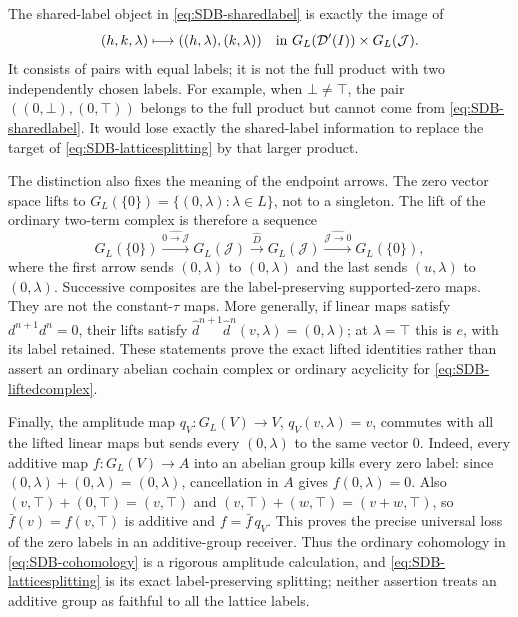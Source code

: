 The shared-label object in \eqref{eq:SDB-sharedlabel} is exactly the
image of
\[
 (h,k,\lambda)\longmapsto((h,\lambda),(k,\lambda))
 \quad\hbox{in }G_L(\mathcal D'(I))\times G_L(\mathcal J).
\]
It consists of pairs with equal labels; it is not the full product
with two independently chosen labels. For example, when $\bot\ne\top$,
the pair $((0,\bot),(0,\top))$ belongs to the full product but
cannot come from \eqref{eq:SDB-sharedlabel}. It would lose exactly
the shared-label information to replace the target of
\eqref{eq:SDB-latticesplitting} by that larger product.

The distinction also fixes the meaning of the endpoint arrows.
The zero vector space lifts to
$G_L(\{0\})=\{(0,\lambda):\lambda\in L\}$, not to a singleton.
The lift of the ordinary two-term complex is therefore a sequence
\begin{equation}\tag{SDB39}\label{eq:SDB-liftedcomplex}
 G_L(\{0\})\xrightarrow{\widehat{0\to\mathcal J}}
 G_L(\mathcal J)\xrightarrow{\widehat D}G_L(\mathcal J)
 \xrightarrow{\widehat{\mathcal J\to0}}G_L(\{0\}),
\end{equation}
where the first arrow sends $(0,\lambda)$ to $(0,\lambda)$ and
the last sends $(u,\lambda)$ to $(0,\lambda)$.
Successive composites are the label-preserving supported-zero maps.
They are not the constant-$\tau$ maps. More generally, if linear
maps satisfy $d^{n+1}d^n=0$, their lifts satisfy
$\widehat d^{n+1}\widehat d^n(v,\lambda)=(0,\lambda)$;
at $\lambda=\top$ this is $e$, with its label retained.
These statements prove the exact lifted identities rather than
assert an ordinary abelian cochain complex or ordinary acyclicity
for \eqref{eq:SDB-liftedcomplex}.

Finally, the amplitude map $q_V:G_L(V)\to V$,
$q_V(v,\lambda)=v$, commutes with all the lifted linear maps but
sends every $(0,\lambda)$ to the same vector $0$.
Indeed, every additive map $f:G_L(V)\to A$ into an abelian group
kills every zero label: since
$(0,\lambda)+(0,\lambda)=(0,\lambda)$, cancellation in $A$
gives $f(0,\lambda)=0$. Also
$(v,\top)+(0,\top)=(v,\top)$ and
$(v,\top)+(w,\top)=(v+w,\top)$, so
$\bar f(v)=f(v,\top)$ is additive and
$f=\bar f\,q_V$. This proves the precise universal loss of the
zero labels in an additive-group receiver. Thus the ordinary
cohomology in \eqref{eq:SDB-cohomology} is a rigorous amplitude
calculation, and \eqref{eq:SDB-latticesplitting} is its exact
label-preserving splitting; neither assertion treats an additive
group as faithful to all the lattice labels.


